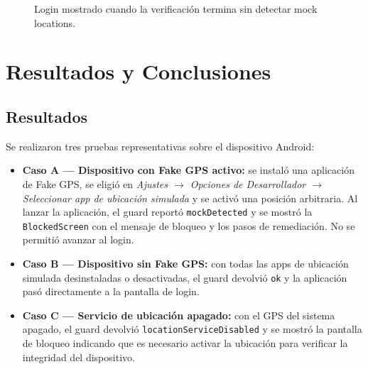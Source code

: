 \documentclass[12pt, a4paper]{article}
\begin{document}
\begin{figure}[h]
    \centering
    \caption{Login mostrado cuando la verificación termina sin detectar mock locations.}
    \label{fig:login-ok}
\end{figure}

\section{Resultados y Conclusiones}
\label{sec:resultados}

\subsection{Resultados}
Se realizaron tres pruebas representativas sobre el dispositivo Android:

\begin{itemize}
    \item \textbf{Caso A — Dispositivo con Fake GPS activo:} se instaló
    una aplicación de Fake GPS, se eligió en
    \textit{Ajustes \(\rightarrow\) Opciones de Desarrollador \(\rightarrow\)
    Seleccionar app de ubicación simulada} y se activó una posición
    arbitraria. Al lanzar la aplicación, el guard reportó
    \texttt{mockDetected} y se mostró la \texttt{BlockedScreen} con el
    mensaje de bloqueo y los pasos de remediación. No se permitió
    avanzar al login.
    \item \textbf{Caso B — Dispositivo sin Fake GPS:} con todas las apps
    de ubicación simulada desinstaladas o desactivadas, el guard
    devolvió \texttt{ok} y la aplicación pasó directamente a la
    pantalla de login.
    \item \textbf{Caso C — Servicio de ubicación apagado:} con el GPS
    del sistema apagado, el guard devolvió
    \texttt{locationServiceDisabled} y se mostró la pantalla de bloqueo
    indicando que es necesario activar la ubicación para verificar la
    integridad del dispositivo.
\end{itemize}
\end{document}
